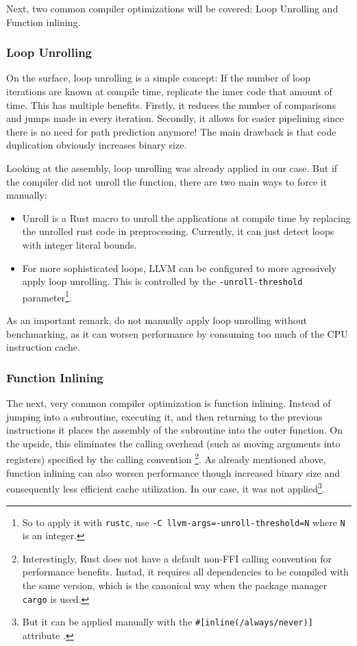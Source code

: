 Next, two common compiler optimizations will be covered: Loop Unrolling and Function inlining.

\subsubsection{Loop Unrolling}

On the surface, loop unrolling is a simple concept: If the number of loop iterations are known at compile time, replicate the inner code that amount of time. This has multiple benefits. Firstly, it reduces the number of comparisons and jumps made in every iteration. Secondly, it allows for easier pipelining since there is no need for path prediction anymore! The main drawback is that code duplication obviously increases binary size.

Looking at the assembly, loop unrolling was already applied in our case. But if the compiler did not unroll the function, there are two main ways to force it manually:
\begin{itemize}
  \item Unroll \cite{unroll} is a Rust macro to unroll the applications at compile time by replacing the unrolled rust code in preprocessing. Currently, it can just detect loops with integer literal bounds.
  \item For more sophisticated loops, LLVM can be configured to more agressively apply loop unrolling. This is controlled by the \texttt{-unroll-threshold} parameter\footnote{So to apply it with \texttt{rustc}, use \texttt{-C llvm-args=-unroll-threshold=N} where \texttt{N} is an integer.}.
\end{itemize}
As an important remark, do not manually apply loop unrolling without benchmarking, as it can worsen performance by consuming too much of the CPU instruction cache.

\subsubsection{Function Inlining}

The next, very common compiler optimization is function inlining. Instead of jumping into a subroutine, executing it, and then returning to the previous instructions it places the assembly of the subroutine into the outer function. On the upside, this eliminates the calling overhead (such as moving arguments into registers) specified by the calling convention \footnote{Interestingly, Rust does not have a default non-FFI calling convention for performance benefits. Instad, it requires all dependencies to be compiled with the same version, which is the canonical way when the package manager \texttt{cargo} is used.}. As already mentioned above, function inlining can also worsen performance though increased binary size and consequently less efficient cache utilization. In our case, it was not applied\footnote{But it can be applied manually with the \texttt{\#[inline(/always/never)]} attribute \cite{inline}.}.\\

